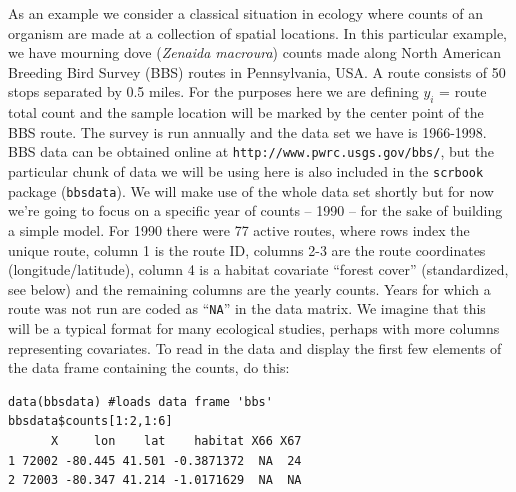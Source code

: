 As an example we consider a classical situation in ecology where
counts of an organism are made at a collection of spatial
locations. In this particular example, we have mourning dove 
({\it Zenaida macroura})
counts
made along North American Breeding Bird Survey (BBS) routes in
Pennsylvania, USA. A route consists of 50 stops separated by 0.5
miles. For the purposes here we are defining $y_i$ = route total count
and the sample location will be marked by the center point of the BBS
route.  The survey is run annually and the data set we have is
1966-1998. BBS data can be obtained online at \mbox{\tt http:\//\//www.pwrc.usgs.gov\//bbs\//}, but the particular chunk of data we will be using here is also included in the {\tt scrbook} package ({\tt bbsdata}).
We will make use of the whole data set shortly but for now we're going
to focus on a specific year of counts -- 1990 -- for the sake of
building a simple model.
 For 1990 there were 77 active routes, where rows index the unique route, column 1 is the
route ID, columns 2-3 are the route coordinates (longitude/latitude),
column 4 is a habitat covariate ``forest cover'' (standardized, see
below) and the remaining columns are the yearly counts. Years for
which a route was not run are coded as ``\mbox{\tt NA}'' in the data matrix. We
imagine that this will be a typical format for many ecological
studies, perhaps with more columns representing covariates.  To read
in the data and display the first few elements of the data frame containing the counts, do
this:
{\small
\begin{verbatim}
data(bbsdata) #loads data frame 'bbs'
bbsdata$counts[1:2,1:6]
      X     lon    lat    habitat X66 X67
1 72002 -80.445 41.501 -0.3871372  NA  24
2 72003 -80.347 41.214 -1.0171629  NA  NA
\end{verbatim}
}


